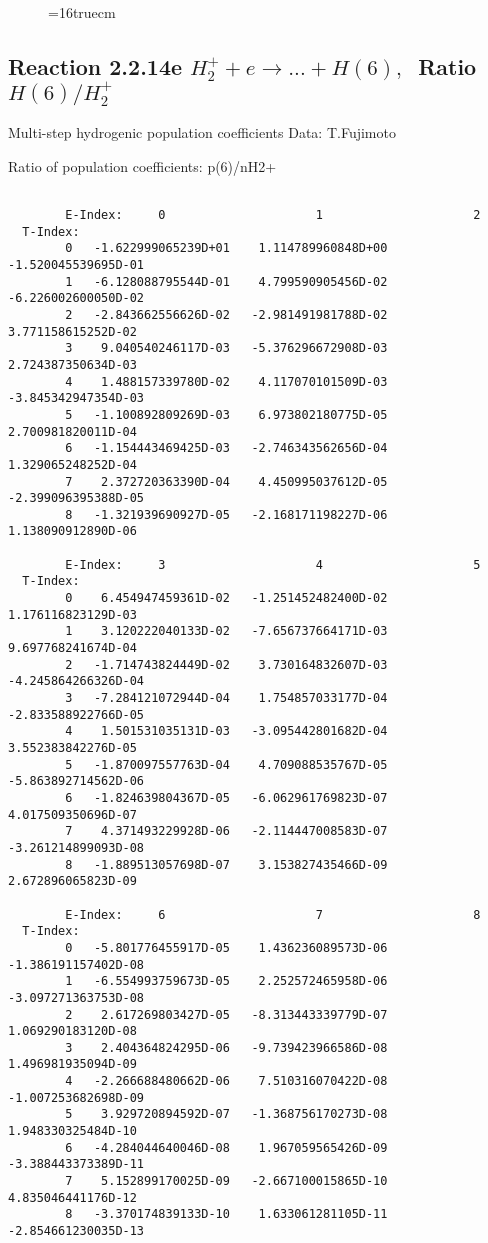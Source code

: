 \documentclass[12pt]{article}
\begin{document}
\begin{figure} \label{2.2.14d}
\epsfxsize=16truecm
\end{figure}
\newpage


\subsection{
Reaction 2.2.14e $ H_2^+ + e \rightarrow ...+ H(6) , \   $
Ratio $H(6)/H_2^+  $
}

 Multi-step hydrogenic population coefficients
 Data: T.Fujimoto

 Ratio of population coefficients: p(6)/nH2+

\begin{small}\begin{verbatim}

        E-Index:     0                     1                     2
  T-Index:
        0   -1.622999065239D+01    1.114789960848D+00   -1.520045539695D-01
        1   -6.128088795544D-01    4.799590905456D-02   -6.226002600050D-02
        2   -2.843662556626D-02   -2.981491981788D-02    3.771158615252D-02
        3    9.040540246117D-03   -5.376296672908D-03    2.724387350634D-03
        4    1.488157339780D-02    4.117070101509D-03   -3.845342947354D-03
        5   -1.100892809269D-03    6.973802180775D-05    2.700981820011D-04
        6   -1.154443469425D-03   -2.746343562656D-04    1.329065248252D-04
        7    2.372720363390D-04    4.450995037612D-05   -2.399096395388D-05
        8   -1.321939690927D-05   -2.168171198227D-06    1.138090912890D-06

        E-Index:     3                     4                     5
  T-Index:
        0    6.454947459361D-02   -1.251452482400D-02    1.176116823129D-03
        1    3.120222040133D-02   -7.656737664171D-03    9.697768241674D-04
        2   -1.714743824449D-02    3.730164832607D-03   -4.245864266326D-04
        3   -7.284121072944D-04    1.754857033177D-04   -2.833588922766D-05
        4    1.501531035131D-03   -3.095442801682D-04    3.552383842276D-05
        5   -1.870097557763D-04    4.709088535767D-05   -5.863892714562D-06
        6   -1.824639804367D-05   -6.062961769823D-07    4.017509350696D-07
        7    4.371493229928D-06   -2.114447008583D-07   -3.261214899093D-08
        8   -1.889513057698D-07    3.153827435466D-09    2.672896065823D-09

        E-Index:     6                     7                     8
  T-Index:
        0   -5.801776455917D-05    1.436236089573D-06   -1.386191157402D-08
        1   -6.554993759673D-05    2.252572465958D-06   -3.097271363753D-08
        2    2.617269803427D-05   -8.313443339779D-07    1.069290183120D-08
        3    2.404364824295D-06   -9.739423966586D-08    1.496981935094D-09
        4   -2.266688480662D-06    7.510316070422D-08   -1.007253682698D-09
        5    3.929720894592D-07   -1.368756170273D-08    1.948330325484D-10
        6   -4.284044640046D-08    1.967059565426D-09   -3.388443373389D-11
        7    5.152899170025D-09   -2.667100015865D-10    4.835046441176D-12
        8   -3.370174839133D-10    1.633061281105D-11   -2.854661230035D-13


\end{verbatim}
\end{small}
\end{document}
